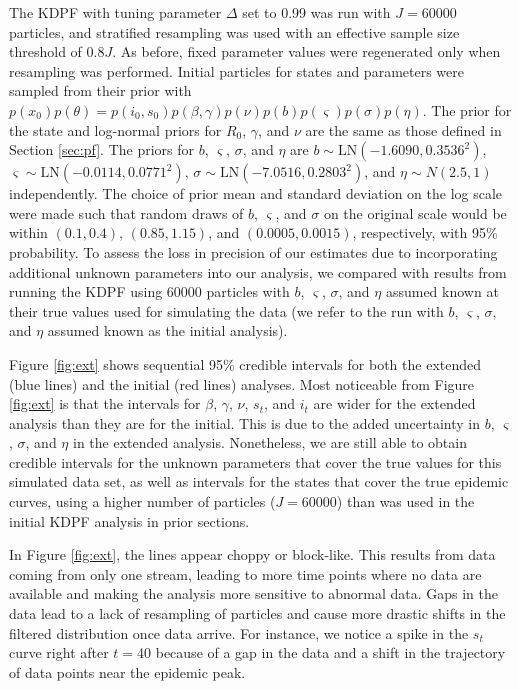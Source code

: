 \documentclass{elsarticle}
\begin{document}
The KDPF with tuning parameter $\Delta$ set to 0.99 was run with $J = 60000$ particles, and stratified resampling was used with an effective sample size threshold of $0.8J$. As before, fixed parameter values were regenerated only when resampling was performed. Initial particles for states and parameters were sampled from their prior with $p(x_0)p(\theta) = p(i_0, s_0)p(\beta, \gamma)p(\nu)p(b)p(\varsigma)p(\sigma)p(\eta)$. The prior for the state and log-normal priors for $R_0$, $\gamma$, and $\nu$ are the same as those defined in Section \ref{sec:pf}. The priors for $b$, $\varsigma$, $\sigma$, and $\eta$ are $b \sim \mbox{LN}(-1.6090, 0.3536^2)$, $\varsigma \sim \mbox{LN}(-0.0114, 0.0771^2)$, $\sigma \sim \mbox{LN}(-7.0516, 0.2803^2)$, and $\eta \sim N(2.5, 1)$ independently. The choice of prior mean and standard deviation on the log scale were made such that random draws of $b$, $\varsigma$, and $\sigma$ on the original scale would be within $(0.1, 0.4)$, $(0.85, 1.15)$, and $(0.0005, 0.0015)$, respectively, with 95\% probability. To assess the loss in precision of our estimates due to incorporating additional unknown parameters into our analysis, we compared with results from running the KDPF using 60000 particles with $b$, $\varsigma$, $\sigma$, and $\eta$ assumed known at their true values used for simulating the data (we refer to the run with $b$, $\varsigma$, $\sigma$, and $\eta$ assumed known as the initial analysis).

Figure \ref{fig:ext} shows sequential 95\% credible intervals for both the extended (blue lines) and the initial (red lines) analyses. Most noticeable from Figure \ref{fig:ext} is that the intervals for $\beta$, $\gamma$, $\nu$, $s_t$, and $i_t$ are wider for the extended analysis than they are for the initial. This is due to the added uncertainty in $b$, $\varsigma$, $\sigma$, and $\eta$ in the extended analysis. Nonetheless, we are still able to obtain credible intervals for the unknown parameters that cover the true values for this simulated data set, as well as intervals for the states that cover the true epidemic curves, using a higher number of particles ($J = 60000$) than was used in the initial KDPF analysis in prior sections.

In Figure \ref{fig:ext}, the lines appear choppy or block-like. This results from data coming from only one stream, leading to more time points where no data are available and making the analysis more sensitive to abnormal data. Gaps in the data lead to a lack of resampling of particles and cause more drastic shifts in the filtered distribution once data arrive. For instance, we notice a spike in the $s_t$ curve right after $t = 40$ because of a gap in the data and a shift in the trajectory of data points near the epidemic peak.
\end{document}
